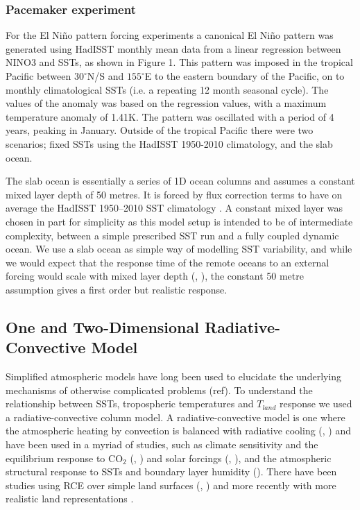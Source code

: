 \subsubsection{Pacemaker experiment}\label{methods:pacemaker}
For the El Ni{\~n}o pattern forcing experiments a canonical El Ni{\~n}o pattern 
was generated using HadISST monthly mean data from a linear regression between 
NINO3 and SSTs, as shown in Figure 1. This pattern was imposed in the tropical 
Pacific between $30^{\circ}$N/S and $155^{\circ}$E to the eastern boundary of 
the Pacific, on to monthly climatological SSTs (i.e. a repeating 12 month 
seasonal cycle).  The values of the anomaly was based on the regression values, 
with a maximum temperature anomaly of 1.41K.  The pattern was oscillated with a 
period of 4 years, peaking in January.  Outside of the tropical Pacific there 
were two scenarios; fixed SSTs using the HadISST 1950-2010 climatology, and the 
slab ocean.  

The slab ocean is essentially a series of 1D ocean columns and assumes a 
constant mixed layer depth of 50 metres. It is forced by flux correction terms 
to have on average the HadISST 1950--2010 SST climatology \citep{Wang2014}. A 
constant mixed layer was chosen in part for simplicity as this model setup is 
intended to be of intermediate complexity, between a simple prescribed SST run 
and a fully coupled dynamic ocean. We use a slab ocean as simple way of 
modelling SST variability, and while we would expect that the response time of 
the remote oceans to an external forcing would scale with mixed layer depth 
(\citealt{Su2005a}, \citealt{Lintner2007}), the constant 50 metre assumption 
gives a first order but realistic response.  


\subsection{One and Two-Dimensional Radiative-Convective Model}
Simplified atmospheric models have long been used to elucidate the underlying 
mechanisms of otherwise complicated problems (ref). To understand the 
relationship between SSTs, tropospheric temperatures and $T_{land}$ response we 
used a radiative-convective column model. A radiative-convective model is one 
where the atmospheric heating by convection is balanced with radiative cooling 
(\citet{Manabe1964}, \citet{Manabe1965}) and have been used in a myriad of 
studies, such as climate sensitivity and the equilibrium response to CO$_2$ 
(\citet{Manabe1975}, \citet{Augustsson1977}) and solar forcings 
(\citet{Wetherald1975}, \citet{Renno1994}), and the atmospheric structural 
response to SSTs and boundary layer humidity (\citet{Ramsay2011}).  There have 
been studies using RCE over simple land surfaces (\citet{Renno1997}, 
\citet{Abbot2007}) and more recently with more realistic land representations 
\citep{Rochetin2014}.

